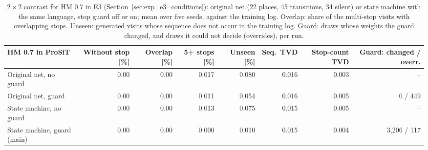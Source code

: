 \begin{table}[htbp]
\centering
\footnotesize
\setlength{\tabcolsep}{3pt}
\begin{tabularx}{\textwidth}{Yrrrrrrr}
\toprule
\textbf{HM 0.7 in ProSiT} & \textbf{Without stop [\%]} & \textbf{Overlap [\%]} & \textbf{5+ stops [\%]} & \textbf{Unseen [\%]} & \textbf{Seq.\ TVD} & \textbf{Stop-count TVD} & \textbf{Guard: changed / overr.} \\
\midrule
Original net, no guard & 0.00 & 0.00 & 0.017 & 0.080 & 0.016 & 0.003 & -- \\
Original net, guard & 0.00 & 0.00 & 0.011 & 0.054 & 0.016 & 0.005 & 0 / 449 \\
State machine, no guard & 0.00 & 0.00 & 0.013 & 0.075 & 0.015 & 0.005 & -- \\
State machine, guard (main) & 0.00 & 0.00 & 0.000 & 0.010 & 0.015 & 0.004 & 3,206 / 117 \\
\bottomrule
\end{tabularx}
\caption{$2\times2$ contrast for HM 0.7 in E3 (Section~\ref{sec:exp_e3_conditions}): original net (22 places, 45 transitions, 34 silent) or state machine with the same language, stop guard off or on; mean over five seeds, against the training log. Overlap: share of the multi-stop visits with overlapping stops. Unseen: generated visits whose sequence does not occur in the training log. Guard: draws whose weights the guard changed, and draws it could not decide (overrides), per run.}
\label{tab:rq1_e3_2x2_hm}
\end{table}
